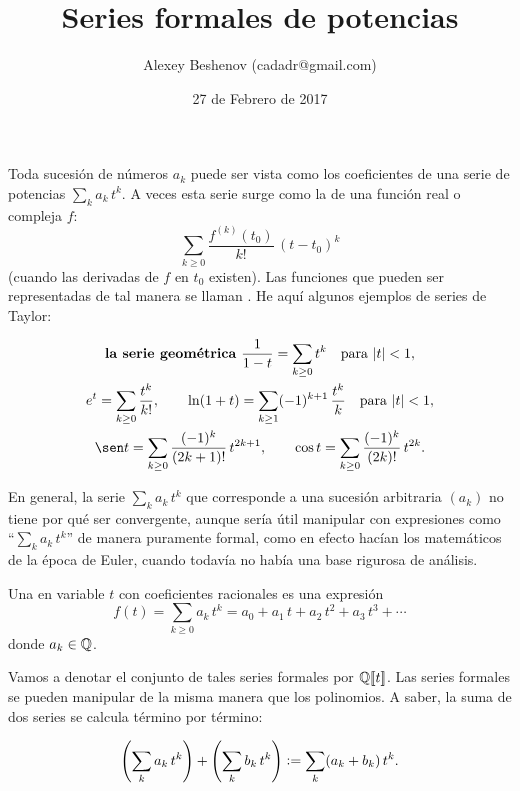 \documentclass{article}
\author{Alexey Beshenov (cadadr@gmail.com)}
\title{Series formales de potencias}
\date{27 de Febrero de 2017}
\begin{document}
{\normalfont\sffamily\bfseries \maketitle}

Toda sucesión de números $a_k$ puede ser vista como los coeficientes de una serie de potencias $\sum_k a_k\,t^k$. A veces esta serie surge como la  de una función real o compleja $f$:
$$\sum_{k\ge 0} \frac{f^{(k)} (t_0)}{k!} \, (t-t_0)^k$$
(cuando las derivadas de $f$ en $t_0$ existen). Las funciones que pueden ser representadas de tal manera se llaman . He aquí algunos ejemplos de series de Taylor:

\begin{gather*}
\text{\term{la serie geométrica} }\frac{1}{1-t} = \sum_{k \ge 0} t^k\quad\text{para }|t| < 1,\\
e^t = \sum_{k\ge 0} \frac{t^k}{k!}, \quad\quad \ln (1+t) = \sum_{k \ge 1} (-1)^{k+1}\,\frac{t^k}{k}\quad\text{para }|t| < 1,\\
\sen t = \sum_{k \ge 0} \frac{(-1)^k}{(2k+1)!}\,t^{2k+1}, \quad\quad \cos t = \sum_{k \ge 0} \frac{(-1)^k}{(2k)!}\,t^{2k}.
\end{gather*}

En general, la serie $\sum_k a_k\,t^k$ que corresponde a una sucesión arbitraria $(a_k)$ no tiene por qué ser convergente, aunque sería útil manipular con expresiones como ``$\sum_k a_k\,t^k$'' de manera puramente formal, como en efecto hacían los matemáticos de la época de Euler, cuando todavía no había una base rigurosa de análisis.

\begin{definicion*}
Una  en variable $t$ con coeficientes racionales es una expresión
$$f (t) = \sum_{k \ge 0} a_k\,t^k = a_0 + a_1\,t + a_2\,t^2 + a_3\,t^3 + \cdots$$
donde $a_k \in \mathbb{Q}$.
\end{definicion*}

Vamos a denotar el conjunto de tales series formales por $\mathbb{Q} [\![t]\!]$. Las series formales se pueden manipular de la misma manera que los polinomios. A saber, la suma de dos series se calcula término por término:

\begin{equation}
\label{adicion-de-series-formales}
\left(\sum_k a_k\,t^k\right) + \left(\sum_k b_k\,t^k\right) \mathrel{\mathop:}= \sum_k (a_k+b_k)\,t^k.
\end{equation}

\pagebreak
\end{document}
